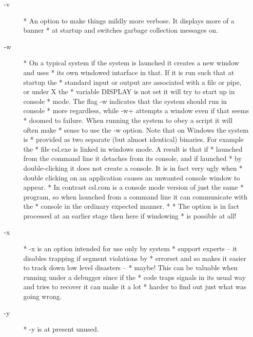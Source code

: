\documentclass[a4paper,11pt]{article}
\begin{document}
\begin{description}
\item [{\ttfamily -v}] 
          * An option to make things mildly more verbose. It displays more of a banner
          * at startup and switches garbage collection messages on.

\item [{\ttfamily -w}] 
          * On a typical system if the system is launched it creates a new window and uses
          * its own windowed intarface in that. If it is run such that at startup the
          * standard input or output are associated with a file or pipe, or under X the
          * variable {\ttfamily DISPLAY} is not set it will try to start up in console
          * mode. The flag {\ttfamily -w} indicates that the system should run in console
          * more regardless, while {\ttfamily -w+} attempts a window even if that seems
          * doomed to failure. When running the system to obey a script it will often make
          * sense to use the {\ttfamily -w} option. Note that on Windows the system is
          * provided as two separate (but almost identical) binaries. For example the
          * file {\ttfamily csl.exe} is linked in windows mode. A result is that if
          * launched from the command line it detaches from its console, and if launched
          * by double-clicking it does not create a console. It is in fact very ugly when
          * double clicking on an application causes an unwanted console window to appear.
          * In contrast {\ttfamily csl.com} is a console mode version of just the same
          * program, so when launched from a command line it can communicate with the
          * console in the ordinary expected manner.
          *
          * The option is in fact processed at an earlier stage then here if windowing
          * is possible at all!

\item [{\ttfamily -x}] 
          * {\ttfamily -x} is an option intended for use only by system
          * support experts -- it disables trapping if segment violations by
          * errorset and so makes it easier to track down low level disasters --
          * maybe!  This can be valuable when running under a debugger since if the
          * code traps signals in its usual way and tries to recover it can make it a lot
          * harder to find out just what was going wrong.

\item [{\ttfamily -y}] 
          * {\ttfamily -y } is at present unused.


\end{description}
\end{document}
